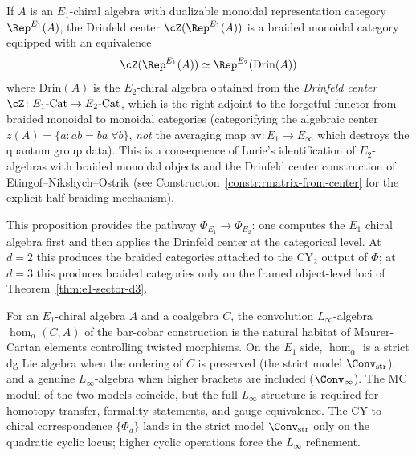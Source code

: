 \begin{proposition}
\label{prop:e2-enhancement-drinfeld}
If $A$ is an $E_1$-chiral algebra with dualizable monoidal representation category $\Rep^{E_1}(A)$, the Drinfeld center $\cZ(\Rep^{E_1}(A))$ is a braided monoidal category equipped with an equivalence
\[
 \cZ(\Rep^{E_1}(A)) \simeq \Rep^{E_2}(\mathrm{Drin}(A))
\]
where $\mathrm{Drin}(A)$ is the $E_2$-chiral algebra obtained from the \emph{Drinfeld center} $\cZ \colon E_1\text{-Cat} \to E_2\text{-Cat}$, which is the right adjoint to the forgetful functor from braided monoidal to monoidal categories (categorifying the algebraic center $z(A) = \{a : ab = ba\;\forall b\}$, \emph{not} the averaging map $\mathrm{av} \colon E_1 \to E_\infty$ which destroys the quantum group data). This is a consequence of Lurie's identification of $E_2$-algebras with braided monoidal objects \cite{LurieHA} and the Drinfeld center construction of Etingof--Nikshych--Ostrik (see Construction~\ref{constr:rmatrix-from-center} for the explicit half-braiding mechanism).
\end{proposition}

This proposition provides the pathway $\Phi_{E_1} \to \Phi_{E_2}$: one computes the $E_1$ chiral algebra first and then applies the Drinfeld center at the categorical level. At $d=2$ this produces the braided categories attached to the CY$_2$ output of $\Phi$; at $d=3$ this produces braided categories only on the framed object-level loci of Theorem~\ref{thm:e1-sector-d3}.

\begin{remark}
\label{rem:convolution-linfty-e1}
For an $E_1$-chiral algebra $A$ and a coalgebra $C$, the convolution $L_\infty$-algebra $\hom_\alpha(C, A)$ of the bar-cobar construction is the natural habitat of Maurer-Cartan elements controlling twisted morphisms. On the $E_1$ side, $\hom_\alpha$ is a strict dg Lie algebra when the ordering of $C$ is preserved (the strict model $\Conv_{\mathrm{str}}$), and a genuine $L_\infty$-algebra when higher brackets are included ($\Conv_\infty$). The MC moduli of the two models coincide, but the full $L_\infty$-structure is required for homotopy transfer, formality statements, and gauge equivalence. The CY-to-chiral correspondence $\{\Phi_d\}$ lands in the strict model $\Conv_{\mathrm{str}}$ only on the quadratic cyclic locus; higher cyclic operations force the $L_\infty$ refinement.
\end{remark}


